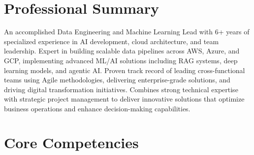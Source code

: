\documentclass[10pt, letterpaper]{article}
\begin{document}
\section{Professional Summary}
An accomplished Data Engineering and Machine Learning Lead with 6+ years of specialized experience in AI development, cloud architecture, and team leadership. Expert in building scalable data pipelines across AWS, Azure, and GCP, implementing advanced ML/AI solutions including RAG systems, deep learning models, and agentic AI. Proven track record of leading cross-functional teams using Agile methodologies, delivering enterprise-grade solutions, and driving digital transformation initiatives. Combines strong technical expertise with strategic project management to deliver innovative solutions that optimize business operations and enhance decision-making capabilities.

\section{Core Competencies}
\end{document}
